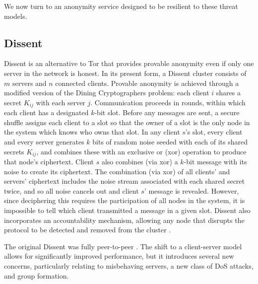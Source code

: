     We now turn to an anonymity service designed to be resilient to these threat
    models.

  \subsection{Dissent}
  \label{Subsection:Dissent}
    Dissent is an alternative to Tor that provides provable anonymity even if
    only one server in the network is honest\cite{corrigan-gibbs_dissent:_2010}.
    In its present form, a Dissent cluster consists of $m$ servers and $n$
    connected clients\cite{wolinsky_dissent_2012}. Provable anonymity is
    achieved through a modified version of the Dining Cryptographers
    problem\cite{chaum_dining_1988}: each client $i$ shares a secret $K_{ij}$
    with each server $j$. Communication proceeds in rounds, within which each
    client has a designated $k$-bit slot.  Before any messages are sent, a
    secure shuffle\cite{neff_verifiable_2001} assigns each client to a slot so
    that the owner of a slot is the only node in the system which knows who owns
    that slot.  In any client $s$'s slot, every client and every server
    generates $k$ bits of random noise seeded with each of its shared secrets
    $K_{ij}$, and combines these with an exclusive or (xor) operation to produce
    that node's ciphertext. Client $s$ also combines (via xor) a $k$-bit message
    with its noise to create its ciphertext. The combination (via xor) of all
    clients' and servers' ciphertext includes the noise stream associated with
    each shared secret twice, and so all noise cancels out and client $s$'
    message is revealed. However, since deciphering this requires the
    participation of all nodes in the system, it is impossible to tell which
    client transmitted a message in a given slot. Dissent also incorporates an
    accountability mechanism, allowing any node that disrupts the protocol to be
    detected and removed from the cluster
    \cite{corrigan-gibbs_proactively_2013}.

    The original Dissent was fully peer-to-peer
    \cite{corrigan-gibbs_dissent:_2010}. The shift to a client-server model
    allows for significantly improved performance, but it introduces several new
    concerns, particularly relating to misbehaving servers, a new class of DoS
    attacks, and group formation.


